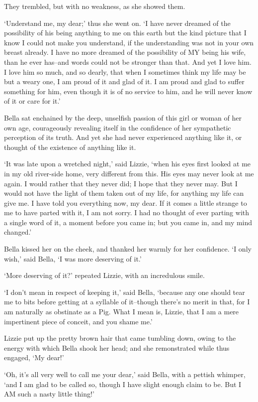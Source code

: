 They trembled, but with no weakness, as she showed them.

‘Understand me, my dear;’ thus she went on. ‘I have never dreamed of
the possibility of his being anything to me on this earth but the
kind picture that I know I could not make you understand, if the
understanding was not in your own breast already. I have no more dreamed
of the possibility of MY being his wife, than he ever has--and words
could not be stronger than that. And yet I love him. I love him so much,
and so dearly, that when I sometimes think my life may be but a weary
one, I am proud of it and glad of it. I am proud and glad to suffer
something for him, even though it is of no service to him, and he will
never know of it or care for it.’

Bella sat enchained by the deep, unselfish passion of this girl or woman
of her own age, courageously revealing itself in the confidence of her
sympathetic perception of its truth. And yet she had never experienced
anything like it, or thought of the existence of anything like it.

‘It was late upon a wretched night,’ said Lizzie, ‘when his eyes first
looked at me in my old river-side home, very different from this. His
eyes may never look at me again. I would rather that they never did; I
hope that they never may. But I would not have the light of them taken
out of my life, for anything my life can give me. I have told you
everything now, my dear. If it comes a little strange to me to have
parted with it, I am not sorry. I had no thought of ever parting with a
single word of it, a moment before you came in; but you came in, and my
mind changed.’

Bella kissed her on the cheek, and thanked her warmly for her
confidence. ‘I only wish,’ said Bella, ‘I was more deserving of it.’

‘More deserving of it?’ repeated Lizzie, with an incredulous smile.

‘I don’t mean in respect of keeping it,’ said Bella, ‘because any
one should tear me to bits before getting at a syllable of it--though
there’s no merit in that, for I am naturally as obstinate as a Pig. What
I mean is, Lizzie, that I am a mere impertinent piece of conceit, and
you shame me.’

Lizzie put up the pretty brown hair that came tumbling down, owing to
the energy with which Bella shook her head; and she remonstrated while
thus engaged, ‘My dear!’

‘Oh, it’s all very well to call me your dear,’ said Bella, with a
pettish whimper, ‘and I am glad to be called so, though I have slight
enough claim to be. But I AM such a nasty little thing!’

